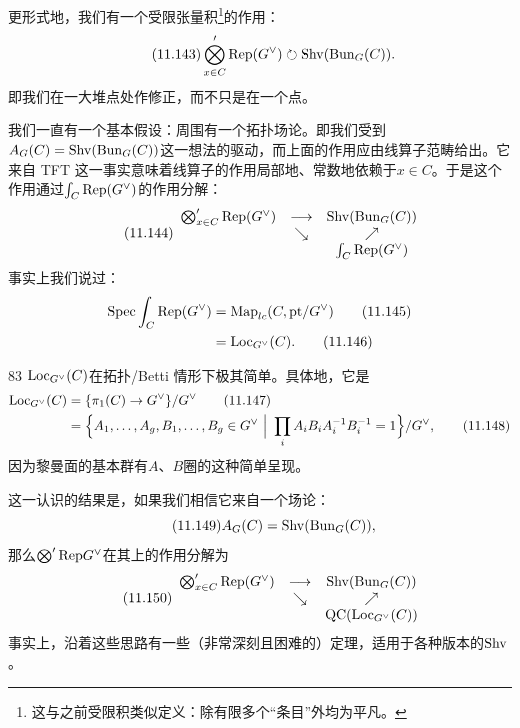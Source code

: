 更形式地，我们有一个受限张量积\footnote{这与之前受限积类似定义：除有限多个“条目”外均为平凡。}的作用：
\begin{equation}\tag{11.143}
\bigotimes'_{x\in C}\mathrm{Rep}(G^{\vee})\circlearrowright\mathrm{Shv}(\mathrm{Bun}_G(C)).
\end{equation}
即我们在一大堆点处作修正，而不只是在一个点。

我们一直有一个基本假设：周围有一个拓扑场论。即我们受到$A_G(C)=\mathrm{Shv}(\mathrm{Bun}_G(C))$这一想法的驱动，而上面的作用应由线算子范畴给出。它来自 TFT 这一事实意味着线算子的作用局部地、常数地依赖于$x\in C$。于是这个作用通过$\int_C\mathrm{Rep}(G^{\vee})$的作用分解：
\begin{equation}\tag{11.144}
\begin{array}{ccc}
\bigotimes'_{x\in C}\mathrm{Rep}(G^{\vee}) & \longrightarrow & \mathrm{Shv}(\mathrm{Bun}_G(C))\\
 & \searrow & \nearrow\\
 & & \int_C\mathrm{Rep}(G^{\vee})
\end{array}
\end{equation}
事实上我们说过：
\begin{align}
\mathrm{Spec}\int_C\mathrm{Rep}(G^{\vee})&=\operatorname{Map}_{lc}(C,\mathrm{pt}/G^{\vee})\tag{11.145}\\
&=\mathrm{Loc}_{G^{\vee}}(C).\tag{11.146}
\end{align}

\begin{srcrem}{83}
$\mathrm{Loc}_{G^{\vee}}(C)$在拓扑/Betti 情形下极其简单。具体地，它是
\begin{align}
\mathrm{Loc}_{G^{\vee}}(C)&=\{\pi_1(C)\to G^{\vee}\}/G^{\vee}\tag{11.147}\\
&=\Bigl\{A_1,\dots,A_g,B_1,\dots,B_g\in G^{\vee}\ \Big|\ \prod_i A_iB_iA_i^{-1}B_i^{-1}=1\Bigr\}/G^{\vee},\tag{11.148}
\end{align}
因为黎曼面的基本群有$A$、$B$圈的这种简单呈现。
\end{srcrem}

这一认识的结果是，如果我们相信它来自一个场论：
\begin{equation}\tag{11.149}
A_G(C)=\mathrm{Shv}(\mathrm{Bun}_G(C)),
\end{equation}
那么$\bigotimes'\mathrm{Rep} G^{\vee}$在其上的作用分解为
\begin{equation}\tag{11.150}
\begin{array}{ccc}
\bigotimes'_{x\in C}\mathrm{Rep}(G^{\vee}) & \longrightarrow & \mathrm{Shv}(\mathrm{Bun}_G(C))\\
 & \searrow & \nearrow\\
 & & \mathrm{QC}(\mathrm{Loc}_{G^{\vee}}(C))
\end{array}
\end{equation}
事实上，沿着这些思路有一些（非常深刻且困难的）定理，适用于各种版本的$\mathrm{Shv}$。

